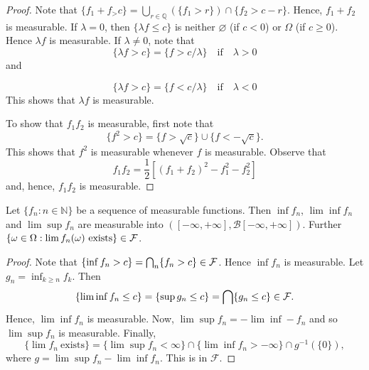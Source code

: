 \begin{proof}
Note that $\{f_1+f_>c \}=\bigcup_{r\in\mathbb{Q}}(\{f_1>r\})\cap \{f_2>c-r \}$. Hence, $f_1+f_2$ is measurable. If $\lambda=0$, then $\{\lambda f\leq c \}$ is neither $\varnothing$ (if $c<0$) or $\Omega$ (if $c\geq 0$). Hence $\lambda f$ is measurable. If $\lambda\neq 0$, note that
\begin{equation*}
\{\lambda f>c \} = \{f>c/\lambda \} \quad \text{if}\quad \lambda >0
\end{equation*}
and

\begin{equation*}
\{\lambda f>c \} = \{f<c/\lambda \} \quad \text{if}\quad \lambda <0
\end{equation*}
This shows that $\lambda f$  is measurable.

To show that $f_1f_2$ is measurable, first note that 
\begin{equation*}
\{f^2>c \}=\{f>\sqrt{c} \}\cup \{f<-\sqrt{c} \}.
\end{equation*}
This shows that $f^2$ is measurable whenever $f$ is measurable. Observe that
\begin{equation*}
f_1f_2=\frac{1}{2}[(f_1+f_2)^2-f_1^2-f_2^2]
\end{equation*}
and, hence, $f_1f_2$ is measurable.
\end{proof}

\begin{theorem}\label{thm:7}
Let $\{f_n: n\in\mathbb{N} \}$ be a sequence of measurable functions. Then $\inf f_n$, $\lim\inf f_n$ and $\lim \sup f_n$ are measurable into $([-\infty, +\infty], \mathcal B[-\infty, +\infty])$. Further $\{\omega \in \Omega : \lim f_n(\omega)\ \text{exists} \}\in\mathcal F$.
\end{theorem}

\begin{proof}
Note that $\{\inf f_n>c \}=\bigcap_n \{f_n>c \}\in\mathcal F$. Hence $\inf f_n$ is measurable. Let $g_n=\inf_{k\geq n}f_k$. Then
\begin{equation*}
\{\lim\inf f_n\leq c \}=\{\sup g_n \leq c \}=\bigcap \{g_n\leq c \}\in\mathcal F.
\end{equation*}
Hence, $\lim\inf f_n$ is measurable. Now, $\lim\sup f_n=-\lim \inf -f_n$ and so $\lim\sup f_n$ is measurable. Finally,
\begin{equation*}
\{\lim f_n\ \text{exists} \}=\{\lim\sup f_n<\infty \}\cap \{\lim\inf f_n>-\infty \}\cap g^{-1}(\{0\}),
\end{equation*}
where $g=\lim\sup f_n-\lim\inf f_n$. This is in $\mathcal F$.
\end{proof}